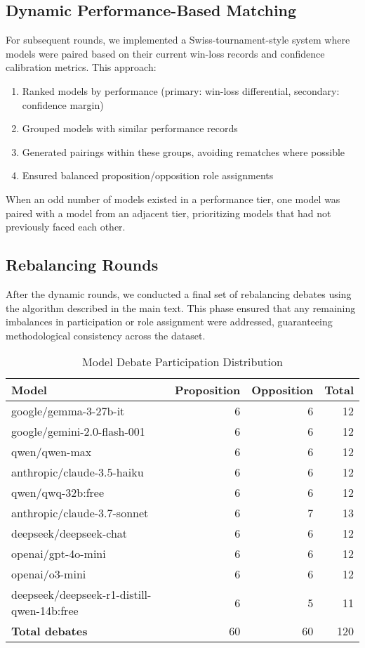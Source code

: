 \documentclass{article}
\begin{document}
\subsection{Dynamic Performance-Based Matching}
For subsequent rounds, we implemented a Swiss-tournament-style system where models were paired based on their current win-loss records and confidence calibration metrics. This approach:
\begin{enumerate}
\item Ranked models by performance (primary: win-loss differential, secondary: confidence margin)
\item Grouped models with similar performance records
\item Generated pairings within these groups, avoiding rematches where possible
\item Ensured balanced proposition/opposition role assignments
\end{enumerate}
When an odd number of models existed in a performance tier, one model was paired with a model from an adjacent tier, prioritizing models that had not previously faced each other.
\subsection{Rebalancing Rounds}
After the dynamic rounds, we conducted a final set of rebalancing debates using the algorithm described in the main text. This phase ensured that any remaining imbalances in participation or role assignment were addressed, guaranteeing methodological consistency across the dataset.

\begin{table}[h]
  \caption{Model Debate Participation Distribution}
  \label{tab}
  \centering
  \begin{tabular}{lrrr}
  \toprule
  \textbf{Model} & \textbf{Proposition} & \textbf{Opposition} & \textbf{Total} \\
  \midrule
  google/gemma-3-27b-it & 6 & 6 & 12 \\
  google/gemini-2.0-flash-001 & 6 & 6 & 12 \\
  qwen/qwen-max & 6 & 6 & 12 \\
  anthropic/claude-3.5-haiku & 6 & 6 & 12 \\
  qwen/qwq-32b:free & 6 & 6 & 12 \\
  anthropic/claude-3.7-sonnet & 6 & 7 & 13 \\
  deepseek/deepseek-chat & 6 & 6 & 12 \\
  openai/gpt-4o-mini & 6 & 6 & 12 \\
  openai/o3-mini & 6 & 6 & 12 \\
  deepseek/deepseek-r1-distill-qwen-14b:free & 6 & 5 & 11 \\
  \midrule
  \textbf{Total debates} & 60 & 60 & 120 \\
  \bottomrule
  \end{tabular}
\end{table}
\end{document}
